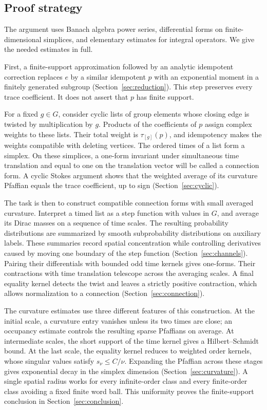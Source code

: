 \subsection{Proof strategy}
The argument uses Banach algebra power series, differential forms on
finite-dimensional simplices, and elementary estimates for integral
operators. We give the needed estimates in full.

First, a finite-support approximation followed by an analytic
idempotent correction replaces $e$ by a similar idempotent $p$ with an
exponential moment in a finitely generated subgroup
(Section~\ref{sec:reduction}). This step preserves every trace
coefficient. It does not assert that $p$ has finite support.

For a fixed $g\in G$, consider cyclic lists of group elements whose
closing edge is twisted by multiplication by $g$. Products of the
coefficients of $p$ assign complex weights to these lists. Their total
weight is $\tau_{[g]}(p)$, and idempotency makes the weights compatible
with deleting vertices. The ordered times of a list form a simplex.
On these simplices, a one-form invariant under simultaneous time
translation and equal to one on the translation vector will be called
a connection form. A cyclic Stokes argument shows that the weighted
average of its curvature Pfaffian equals the trace coefficient, up to
sign (Section~\ref{sec:cyclic}).

The task is then to construct compatible connection forms with small
averaged curvature. Interpret a timed list as a step function with
values in $G$, and average its Dirac masses on a sequence of time scales.
The resulting probability distributions are summarized by smooth
subprobability distributions on auxiliary labels. These summaries
record spatial concentration while controlling derivatives caused by
moving one boundary of the step function
(Section~\ref{sec:channels}). Pairing their differentials with bounded
odd time kernels gives one-forms. Their contractions with time
translation telescope across the averaging scales. A final equality
kernel detects the twist and leaves a strictly positive contraction,
which allows normalization to a connection
(Section~\ref{sec:connection}).

The curvature estimates use three different features of this
construction. At the initial scale, a curvature entry vanishes unless
its two times are close; an occupancy estimate controls the resulting
sparse Pfaffians on average. At intermediate scales, the short support
of the time kernel gives a Hilbert--Schmidt bound. At the last scale,
the equality kernel reduces to weighted order kernels, whose singular
values satisfy $s_\nu\le C/\nu$. Expanding the Pfaffian across these
stages gives exponential decay in the simplex dimension
(Section~\ref{sec:curvature}). A single spatial radius works for every
infinite-order class and every finite-order class avoiding a fixed
finite word ball. This uniformity proves the finite-support conclusion
in Section~\ref{sec:conclusion}.
